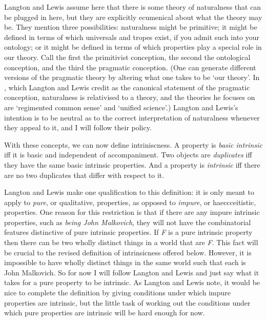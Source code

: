 \noindent Langton and Lewis assume here that there is some theory of naturalness that can be plugged in here, but they are explicitly ecumenical about what the theory may be. They mention three possibilities: naturalness might be primitive; it might be defined in terms of which universals and tropes exist, if you admit such into your ontology; or it might be defined in terms of which properties play a special role in our theory. Call the first the primitivist conception, the second the ontological conception, and the third the pragmatic conception. (One can generate different versions of the pragmatic theory by altering what one takes to be `our theory'. In \citet{Taylor1993}, which Langton and Lewis credit as the canonical statement of the pragmatic conception, naturalness is relativised to a theory, and the theories he focuses on are `regimented common sense' and `unified science'.) Langton and Lewis's intention is to be neutral as to the correct interpretation of naturalness whenever they appeal to it, and I will follow their policy.

With these concepts, we can now define intriniscness. A property is \textit{basic intrinsic} iff it is basic and independent of accompaniment. Two objects are \textit{duplicates }iff they have the same basic intrinsic properties. And a property is \textit{intrinsic} iff there are no two duplicates that differ with respect to it.

Langton and Lewis make one qualification to this definition: it is only meant to apply to \textit{pure}, or qualitative, properties, as opposed to \textit{impure}, or haeccceitistic, properties. One reason for this restriction is that if there are any impure intrinsic properties, such as \textit{being John Malkovich}, they will not have the combinatorial features distinctive of pure intrinsic properties. If \textit{F} is a pure intrinsic property then there can be two wholly distinct things in a world that are \textit{F}. This fact will be crucial to the revised definition of intrinsicness offered below. However, it is impossible to have wholly distinct things in the same world such that each is John Malkovich. So for now I will follow Langton and Lewis and just say what it takes for a pure property to be intrinsic. As Langton and Lewis note, it would be nice to complete the definition by giving conditions under which impure properties are intrinsic, but the little task of working out the conditions under which pure properties are intrinsic will be hard enough for now.

